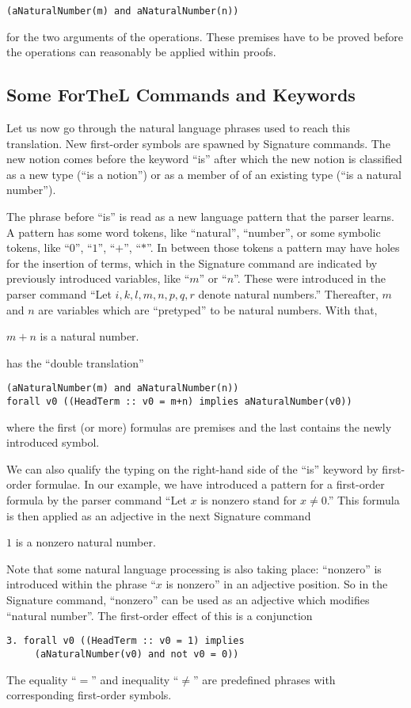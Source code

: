 \documentclass[11pt]{article}
\begin{document}
\verb+(aNaturalNumber(m) and aNaturalNumber(n))+

\noindent for the two arguments of the operations. These premises have to
be proved before the operations can reasonably be applied within
proofs.

\subsection{Some ForTheL Commands and Keywords}

Let us now go through the natural language phrases used to 
reach this translation. New first-order symbols are spawned by
Signature commands. The new notion comes before the keyword ``is''
after which the new notion is classified as a new type (``is a notion'')
or as a member of of an existing type (``is a natural number'').

The phrase before ``is'' is read as a new language pattern that
the parser learns. A pattern has some word tokens, 
like ``natural'',
``number'', or some symbolic tokens, like 
``$0$'', ``$1$'', ``$+$'', ``$*$''.
In between those tokens a pattern may have holes for the insertion
of terms, which in the Signature command are indicated by previously
introduced variables, like ``$m$'' or ``$n$''. These were introduced in
the parser command ``Let $i,k,l,m,n,p,q,r$ denote natural numbers.''
Thereafter, $m$ and $n$ are variables which are ``pretyped'' to be
natural numbers. With that,
\begin{signature} $m + n$ is a natural number.
\end{signature}
has the ``double translation''
\begin{verbatim}
(aNaturalNumber(m) and aNaturalNumber(n))
forall v0 ((HeadTerm :: v0 = m+n) implies aNaturalNumber(v0))
\end{verbatim}
where the first (or more) formulas are premises and the last contains the
newly introduced symbol.

We can also qualify the typing on the right-hand side of the 
``is'' keyword
by first-order formulae. In our example, we have introduced a pattern for
a first-order formula by the parser command 
``Let $x$ is nonzero stand for $x \neq 0$.'' 
This formula is then applied
as an adjective in the next Signature command
\begin{signature} $1$ is a nonzero natural number.
\end{signature}
Note that some natural language processing is also taking place:
``nonzero'' is introduced within the phrase ``$x$ is nonzero'' 
in an
adjective position. So in the Signature command, ``nonzero'' 
can be
used as an adjective which modifies ``natural number''. 
The first-order
effect of this is a conjunction
\begin{verbatim}
3. forall v0 ((HeadTerm :: v0 = 1) implies 
     (aNaturalNumber(v0) and not v0 = 0)) 
\end{verbatim}
The equality ``$=$'' and inequality ``$\neq$'' are predefined 
phrases with corresponding first-order symbols.
\end{document}
